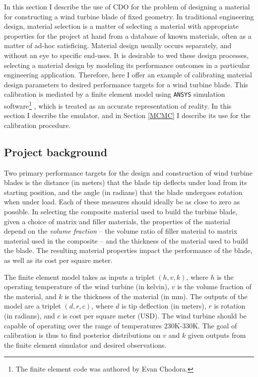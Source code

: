 \documentclass{article}
\begin{document}
In this section I describe the use of CDO for the problem of designing a material for constructing a wind turbine blade of fixed geometry. In traditional engineering design, material selection is a matter of selecting a material with appropriate properties for the project at hand from a database of known materials, often as a matter of ad-hoc satisficing. Material design usually occurs separately, and without an eye to specific end-uses. It is desirable to wed these design processes, selecting a material design by modeling its performance outcomes in a particular engineering application. Therefore, here I offer an example of calibrating material design parameters to desired performance targets for a wind turbine blade. This calibration is mediated by a finite element model using \texttt{ANSYS} simulation software\footnote{
The finite element code was authored by Evan Chodora.
}
, which is treated as an accurate representation of reality. In this section I describe the emulator, and in Section \ref{MCMC} I describe its use for the calibration procedure.

\subsection{Project background}

Two primary performance targets for the design and construction of wind turbine blades is the distance (in meters) that the blade tip deflects under load from its starting position, and the angle (in radians) that the blade undergoes rotation when under load. 
Each of these measures should ideally be as close to zero as possible.
In selecting the composite material used to build the turbine blade, given a choice of matrix and filler materials, the properties of the material depend on the \textit{volume fraction} -- the volume ratio of filler material to matrix material used in the composite -- and the thickness of the material used to build the blade. 
The resulting material properties impact the performance of the blade, as well as its cost per square meter. 

The finite element model takes as inputs a triplet $(h,v,k)$, where $h$ is the operating temperature of the wind turbine (in kelvin), $v$ is the volume fraction of the material, and $k$ is the thickness of the material (in mm). 
The outputs of the model are a triplet $(d,r,c)$, where $d$ is tip deflection (in meters), $r$ is rotation (in radians), and $c$ is cost per square meter (USD). 
The wind turbine should be capable of operating over the range of temperatures 230K-330K. The goal of calibration is thus to find posterior distributions on $v$ and $k$ given outputs from the finite element simulator and desired observations.
\end{document}
